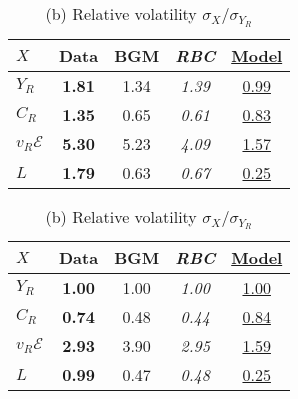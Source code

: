 \documentclass[a4paper,12pt]{article} %
\numberwithin{equation}{section} %
\numberwithin{figure}{section}
\numberwithin{table}{section}
\newcommand{\dat}{\textbf}      %
\newcommand{\rbc}{\emph}        %
\newcommand{\mine}[1]{\underline{#1}}   %
\begin{document}
\begin{table}[H]
\centering
\begin{subtable}[t]{.48\textwidth}
  \centering
  \caption*{(a) Volatility $\sigma_X$}
  \begin{tabular}{lcccc}
  \toprule
   $X$ & \dat{Data} & BGM & \rbc{RBC} & \mine{Model}\\
  \midrule
   $Y_R$      & \dat{1.81} & 1.34 & \rbc{1.39} & \mine{0.99}\\
   $C_R$      & \dat{1.35} & 0.65 & \rbc{0.61} & \mine{0.83}\\
   $v_R\mathcal{E}$   & \dat{5.30} & 5.23 & \rbc{4.09} & \mine{1.57}\\
   $L$        & \dat{1.79} & 0.63 & \rbc{0.67} & \mine{0.25}\\
  \bottomrule
  \end{tabular}
\end{subtable}
\hfill
\begin{subtable}[t]{.48\textwidth}
  \centering
  \caption*{(b) Relative volatility $\sigma_X/\sigma_{Y_R}$}
  \begin{tabular}{lcccc}
  \toprule
   $X$ & \dat{Data} & BGM & \rbc{RBC} & \mine{Model}\\
  \midrule
   $Y_R$      & \dat{1.00} & 1.00 & \rbc{1.00} & \mine{1.00}\\
   $C_R$      & \dat{0.74} & 0.48 & \rbc{0.44} & \mine{0.84}\\
   $v_R\mathcal{E}$   & \dat{2.93} & 3.90 & \rbc{2.95} & \mine{1.59}\\
   $L$        & \dat{0.99} & 0.47 & \rbc{0.48} & \mine{0.25}\\
  \bottomrule
  \end{tabular}
\end{subtable}

\vspace{0.8em}   %


\end{table}
\end{document}
